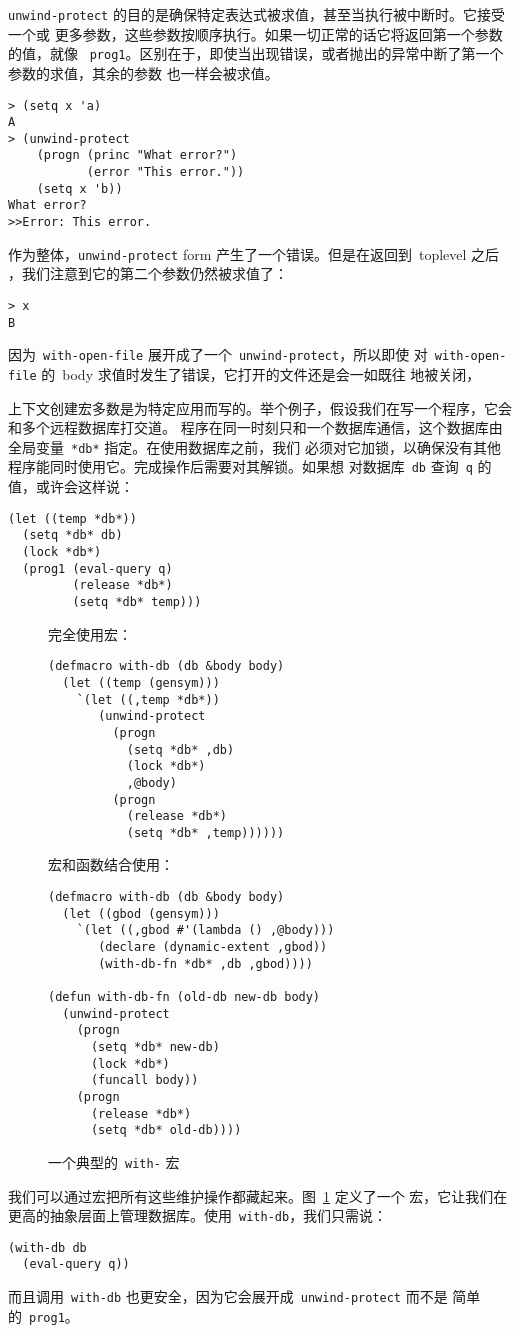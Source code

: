 \texttt{unwind-protect} 的目的是确保特定表达式被求值，甚至当执行被中断时。它接受一个或
更多参数，这些参数按顺序执行。如果一切正常的话它将返回第一个参数的值，就像
~\texttt{prog1}。区别在于，即使当出现错误，或者抛出的异常中断了第一个参数的求值，其余的参数
也一样会被求值。
\begin{lstlisting}
> (setq x 'a)
A
> (unwind-protect
    (progn (princ "What error?")
           (error "This error."))
    (setq x 'b))
What error?
>>Error: This error.
\end{lstlisting}

作为整体，\texttt{unwind-protect} form 产生了一个错误。但是在返回到~toplevel 之后
，我们注意到它的第二个参数仍然被求值了：
\begin{lstlisting}
> x
B
\end{lstlisting}
因为~\texttt{with-open-file} 展开成了一个~\texttt{unwind-protect}，所以即使
对~\texttt{with-open-file} 的~body 求值时发生了错误，它打开的文件还是会一如既往
地被关闭，

上下文创建宏多数是为特定应用而写的。举个例子，假设我们在写一个程序，它会和多个远程数据库打交道。
程序在同一时刻只和一个数据库通信，这个数据库由全局变量~\verb|*db*| 指定。在使用数据库之前，我们
必须对它加锁，以确保没有其他程序能同时使用它。完成操作后需要对其解锁。如果想
对数据库~\texttt{db} 查询~\texttt{q} 的值，或许会这样说：
\begin{lstlisting}
(let ((temp *db*))
  (setq *db* db)
  (lock *db*)
  (prog1 (eval-query q)
         (release *db*)
         (setq *db* temp)))
\end{lstlisting}

\begin{figure}
完全使用宏：
\begin{lstlisting}
(defmacro with-db (db &body body)
  (let ((temp (gensym)))
    `(let ((,temp *db*))
       (unwind-protect
         (progn
           (setq *db* ,db)
           (lock *db*)
           ,@body)
         (progn
           (release *db*)
           (setq *db* ,temp))))))
\end{lstlisting}
宏和函数结合使用：
\begin{lstlisting}
(defmacro with-db (db &body body)
  (let ((gbod (gensym)))
    `(let ((,gbod #'(lambda () ,@body)))
       (declare (dynamic-extent ,gbod))
       (with-db-fn *db* ,db ,gbod))))

(defun with-db-fn (old-db new-db body)
  (unwind-protect
    (progn
      (setq *db* new-db)
      (lock *db*)
      (funcall body))
    (progn
      (release *db*)
      (setq *db* old-db))))
\end{lstlisting}
  \caption{一个典型的~\texttt{with-} 宏}
  \label{fig:a_typical_with_macro}
\end{figure}
我们可以通过宏把所有这些维护操作都藏起来。图~\ref{fig:a_typical_with_macro} 定义了一个
宏，它让我们在更高的抽象层面上管理数据库。使用~\texttt{with-db}，我们只需说：
\begin{lstlisting}
(with-db db
  (eval-query q))
\end{lstlisting}
而且调用~\texttt{with-db} 也更安全，因为它会展开成~\texttt{unwind-protect} 而不是
简单的~\texttt{prog1}。


